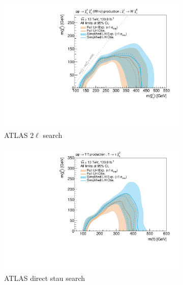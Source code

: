 \begin{figure}
\begin{subfigure}[b]{0.5\textwidth}
	\end{subfigure}\hfill
	\par\medskip
	\begin{subfigure}[b]{0.5\textwidth}
		\centering\includegraphics[width=\textwidth]{exclusion_2L0J_noLabel_v3}
		\caption{ATLAS $2\ell$ search~\cite{SUSY-2018-32}\label{fig:results_2L0J}}
	\end{subfigure}\hfill
	\begin{subfigure}[b]{0.5\textwidth}
		\centering\includegraphics[width=\textwidth]{exclusion_directstaus_noLabel_v3}
		\caption{ATLAS direct stau search~\cite{SUSY-2018-04}\label{fig:results_directstaus}}
	\end{subfigure}\hfill
	\par\medskip
	\begin{subfigure}[b]{0.5\textwidth}

\end{subfigure}
\end{figure}
